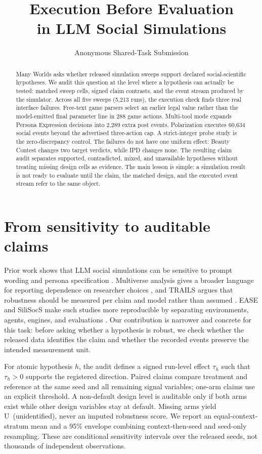 \documentclass[9pt,twocolumn]{extarticle}
\title{\vspace{-1.2em}\textbf{Execution Before Evaluation\\in LLM Social Simulations}\vspace{-0.65em}}
\author{Anonymous Shared-Task Submission}
\date{}
\newcommand{\Upt}{\textsc{U}}
\begin{document}
\maketitle
\vspace{-2.15em}

\begin{abstract}
Many Worlds asks whether released simulation sweeps support declared social-scientific hypotheses. We audit this question at the level where a hypothesis can actually be tested: matched sweep cells, signed claim contrasts, and the event stream produced by the simulator. Across all five sweeps (5,213 runs), the execution check finds three real interface failures. Free-text game parsers select an earlier legal value rather than the model-emitted final parameter line in 288 game actions. Multi-tool mode expands Persona Expression decisions into 2,289 extra post events. Polarization executes 60,634 social events beyond the advertised three-action cap. A strict-integer probe study is the zero-discrepancy control. The failures do not have one uniform effect: Beauty Contest changes two target verdicts, while IPD changes none. The resulting claim audit separates supported, contradicted, mixed, and unavailable hypotheses without treating missing design cells as evidence. The main lesson is simple: a simulation result is not ready to evaluate until the claim, the matched design, and the executed event stream refer to the same object.
\end{abstract}
\vspace{-0.55em}

\section{From sensitivity to auditable claims}
Prior work shows that LLM social simulations can be sensitive to prompt wording and persona specification \cite{ju2024,ye2026}. Multiverse analysis gives a broader language for reporting dependence on researcher choices \cite{linde2026}, and TRAILS argues that robustness should be measured per claim and model rather than assumed \cite{ye2026}. EASE and SiliSocS make such studies more reproducible by separating environments, agents, engines, and evaluations \cite{sarangi2026}. Our contribution is narrower and concrete for this task: before asking whether a hypothesis is robust, we check whether the released data identifies the claim and whether the recorded events preserve the intended measurement unit.

For atomic hypothesis $h$, the audit defines a signed run-level effect $\tau_h$ such that $\tau_h>0$ supports the registered direction. Paired claims compare treatment and reference at the same seed and all remaining signal variables; one-arm claims use an explicit threshold. A non-default design level is auditable only if both arms exist while other design variables stay at default. Missing arms yield \Upt~(unidentified), never an imputed robustness score. We report an equal-context-stratum mean and a 95\% envelope combining context-then-seed and seed-only resampling. These are conditional sensitivity intervals over the released seeds, not thousands of independent observations.
\end{document}
